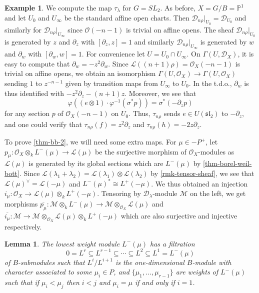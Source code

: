 \documentclass[11pt, a4paper]{article}
\newtheorem{lemma}[theorem]{Lemma}
\theoremstyle{definition}
\newtheorem{example}[theorem]{Example}
\newcommand{\s}[0]{\sigma}
\begin{document}
    \begin{example}
        We compute the map $\tau_\lambda$ for $G=SL_2$. As before, $X=G/B=\mathbb P^1$ and let $U_0$ and $U_\infty$ be the standard affine open charts. Then $\mathcal D_{n\rho}|_{U_0}=\mathcal D_{U_0}$ and similarly for $\mathcal D_{n\rho}|_{U_\infty}$ since $\mathcal O(-n-1)$ is trivial on affine opens. The sheaf $\mathcal D_{n\rho}|_{U_0}$ is generated by $z$ and $\partial_z$ with $[\partial_z, z]=1$ and similarly $\mathcal D_{n\rho}|_{U_\infty}$ is generated by $w$ and $\partial_w$ with $[\partial_w, w]=1$. For convenience let $U=U_0\cap U_\infty$. On $\Gamma(U, \mathcal D_X)$, it is easy to compute that $\partial_w=-z^2\partial_w$. Since $\mathcal L((n+1)\rho)=\mathcal O_X(-n-1)$ is trivial on affine opens, we obtain an isomorphism $\Gamma(U, \mathcal O_X)\to\Gamma(U,\mathcal O_X)$ sending $1$ to $z^{-n-1}$ given by transition maps from $U_\infty$ to $U_0$. In the t.d.o., $\partial_w$ is thus identified with $-z^2\partial_z-(n+1)z$. Moreover, we see that
        \[\varphi((e\otimes 1)\cdot\varphi^{-1}(\s^*p))=\s^*(-\partial_zp)\]
        for any section $p$ of $\mathcal O_X(-n-1)$ on $U_0$. Thus, $\tau_{n\rho}$ sends $e\in U(\mathfrak{sl}_2)$ to $-\partial_z$, and one could verify that $\tau_{n\rho}(f)=z^2\partial_z$ and $\tau_{n\rho}(h)=-2z\partial_z$.
    \end{example}
    To prove \cref{thm-bb-2}, we will need some extra maps. For $\mu\in-P^+$, let $p_\mu:\mathcal O_X\otimes_k L^-(\mu)\to\mathcal L(\mu)$ be the surjective morphism of $\mathcal O_X$-modules as $\mathcal L(\mu)$ is generated by its global sections which are $L^-(\mu)$ by \cref{thm-borel-weil-bott}. Since $\mathcal L(\lambda_1+\lambda_2)=\mathcal L(\lambda_1)\otimes\mathcal L(\lambda_2)$ by \cref{rmk-tensor-sheaf}, we see that $\mathcal L(\mu)^\vee=\mathcal L(-\mu)$ and $L^-(\mu)^*\cong L^+(-\mu)$. We thus obtained an injection $i_\mu:\mathcal O_X\to\mathcal L(\mu)\otimes_k L^+(-\mu)$. Tensoring by $\mathcal D_\lambda$-module $\mathcal M$ on the left, we get morphisms $\overline{p_\mu}:\mathcal M\otimes_k L^{-}(\mu)\to\mathcal M\otimes_{\mathcal O_X}\mathcal L(\mu)$ and $\overline{i_\mu}:\mathcal M\to\mathcal M\otimes_{\mathcal O_X}\mathcal L(\mu)\otimes_k L^+(-\mu)$ which are also surjective and injective respectively.
    \begin{lemma}
        The lowest weight module $L^-(\mu)$ has a filtration
        \[0=L^r\subseteq L^{r-1}\subseteq\cdots\subseteq L^2\subseteq L^1=L^-(\mu)\]
        of $B$-submodules such that $L^i/L^{i+1}$ is the one-dimensional $B$-module with character associated to some $\mu_i\in P$, and $\{\mu_1,\dots,\mu_{r-1}\}$ are weights of $L^-(\mu)$ such that if $\mu_i<\mu_j$ then $i<j$ and $\mu_i=\mu$ if and only if $i=1$.
    \end{lemma}
\end{document}
